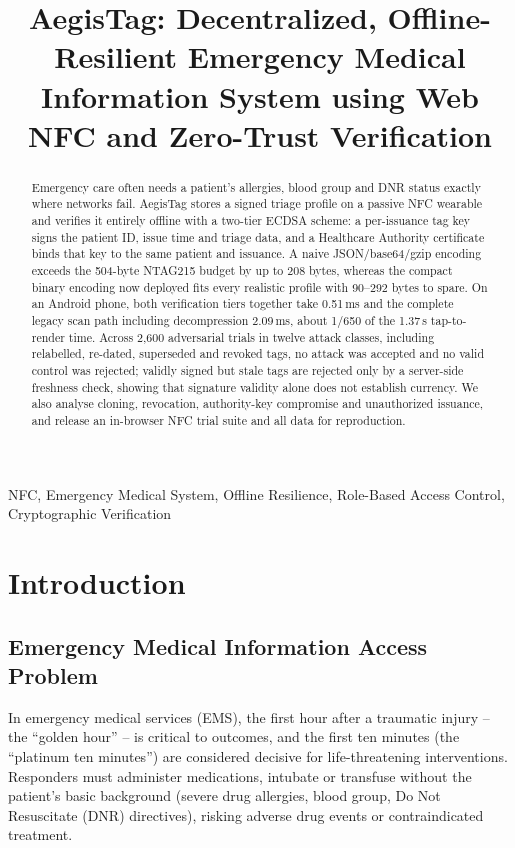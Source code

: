 \documentclass[conference]{IEEEtran}
\begin{document}
\title{AegisTag: Decentralized, Offline-Resilient Emergency Medical Information System using Web NFC and Zero-Trust Verification}

\author{
}

\maketitle

\begin{abstract}
Emergency care often needs a patient's allergies, blood group and DNR status exactly where networks fail. AegisTag stores a signed triage profile on a passive NFC wearable and verifies it entirely offline with a two-tier ECDSA scheme: a per-issuance tag key signs the patient ID, issue time and triage data, and a Healthcare Authority certificate binds that key to the same patient and issuance. A naive JSON/base64/gzip encoding exceeds the 504-byte NTAG215 budget by up to 208 bytes, whereas the compact binary encoding now deployed fits every realistic profile with 90--292 bytes to spare. On an Android phone, both verification tiers together take 0.51\,ms and the complete legacy scan path including decompression 2.09\,ms, about 1/650 of the 1.37\,s tap-to-render time. Across 2{,}600 adversarial trials in twelve attack classes, including relabelled, re-dated, superseded and revoked tags, no attack was accepted and no valid control was rejected; validly signed but stale tags are rejected only by a server-side freshness check, showing that signature validity alone does not establish currency. We also analyse cloning, revocation, authority-key compromise and unauthorized issuance, and release an in-browser NFC trial suite and all data for reproduction.
\end{abstract}

\begin{IEEEkeywords}
NFC, Emergency Medical System, Offline Resilience, Role-Based Access Control, Cryptographic Verification
\end{IEEEkeywords}

\section{Introduction}
\label{sec:intro}

\subsection{Emergency Medical Information Access Problem}
In emergency medical services (EMS), the first hour after a traumatic injury -- the ``golden hour'' -- is critical to outcomes, and the first ten minutes (the ``platinum ten minutes'') are considered decisive for life-threatening interventions. Responders must administer medications, intubate or transfuse without the patient's basic background (severe drug allergies, blood group, Do Not Resuscitate (DNR) directives), risking adverse drug events or contraindicated treatment.
\end{document}
